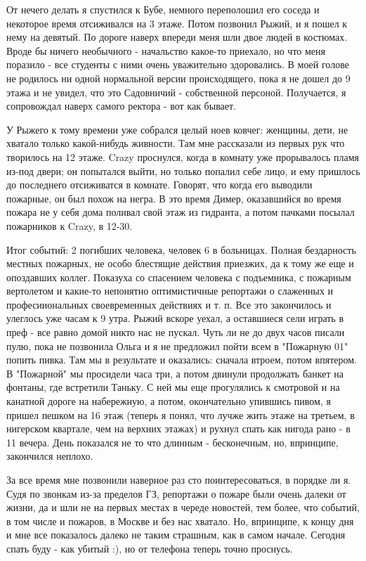 \documentclass[12pt,a4paper]{article}
\begin{document}
От нечего делать я спустился к Бубе, немного переполошил его соседа и некоторое время отсиживался на 3 этаже. Потом позвонил Рыжий, и я пошел к нему на девятый. По дороге наверх впереди меня шли двое людей в костюмах. Вроде бы ничего необычного - начальство какое-то приехало, но что меня поразило - все студенты с ними очень уважительно здоровались. В моей голове не родилось ни одной нормальной версии происходящего, пока я не дошел до 9 этажа и не увидел, что это Садовничий - собственной персоной. Получается, я сопровождал наверх самого ректора - вот как бывает.

 У Рыжего к тому времени уже собрался целый ноев ковчег: женщины, дети, не хватало только какой-нибудь живности. Там мне рассказали из первых рук что творилось на 12 этаже. Crazy проснулся, когда в комнату уже прорывалось пламя из-под двери; он попытался выйти, но только попалил себе лицо, и ему пришлось до последнего отсиживатся в комнате. Говорят, что когда его выводили пожарные, он был похож на негра. В это время Димер, оказавшийся во время пожара не у себя дома поливал свой этаж из гидранта, а потом пачками посылал пожарников к Crazy, в 12-30. 

Итог событий: 2 погибших человека, человек 6 в больницах. Полная бездарность местных пожарных, не особо блестящие действия приезжих, да к тому же еще и опоздавших коллег. Показуха со спасением человека с подъемника, с пожарным вертолетом и какие-то непонятно оптимистичные репортажи о слаженных и професииональных своевременных действиях и т. п. Все это закончилось и улеглось уже часам к 9 утра. Рыжий вскоре уехал, а оставшиеся сели играть в преф - все равно домой никто нас не пускал. Чуть ли не до двух часов писали пулю, пока не позвонила Ольга и я не предложил пойти всем в "Пожарную 01" попить пивка. Там мы в результате и оказались: сначала втроем, потом впятером. В "Пожарной" мы просидели часа три, а потом двинули продолжать банкет на фонтаны, где встретили Таньку. С ней мы еще прогулялись к смотровой и на канатной дороге на набережную, а потом, окончательно упившись пивом, я пришел пешком на 16 этаж (теперь я понял, что лучже жить этаже на третьем, в нигерском квартале, чем на верхних этажах) и рухнул спать как нигода рано - в 11 вечера. День показался не то что длинным - бесконечным, но, впринципе, закончился неплохо.

За все время мне позвонили наверное раз сто поинтересоваться, в порядке ли я. Судя по звонкам из-за пределов ГЗ, репортажи о пожаре были очень далеки от жизни, да и шли не на первых местах в череде новостей, тем более, что событий, в том числе и пожаров, в Москве и без нас хватало. Но, впринципе, к концу дня и мне все показалось далеко не таким страшным, как в самом начале. Сегодня спать буду - как убитый :), но от телефона теперь точно проснусь.
\end{document}
